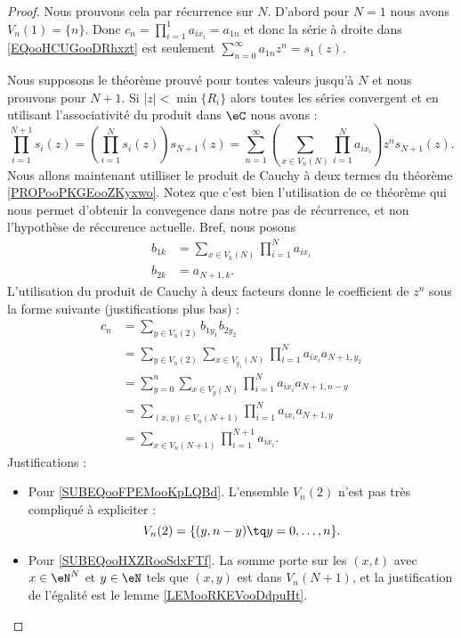 \begin{proof}
	Nous prouvons cela par récurrence sur \( N\). D'abord pour \( N=1\) nous avons \( V_n(1)=\{ n \}\). Donc \( c_n=\prod_{i=1}^1a_{ix_i}=a_{1n}\) et donc la série à droite dans \eqref{EQooHCUGooDRhxzt} est seulement \( \sum_{n=0}^{\infty}a_{1n}z^n=s_1(z)\).

	Nous supposons le théorème prouvé pour toutes valeurs jusqu'à \( N\) et nous prouvons pour \( N+1\). Si \( | z |<\min\{ R_i \}\) alors toutes les séries convergent et en utilisant l'associativité du produit dans \( \eC\) nous avons :
	\begin{equation}
		\prod_{i=1}^{N+1}s_i(z)=\left( \prod_{i=1}^Ns_i(z) \right)s_{N+1}(z)=\sum_{n=1}^{\infty}\left( \sum_{x\in V_n(N)}\prod_{i=1}^Na_{ix_i} \right)z^ns_{N+1}(z).
	\end{equation}
	Nous allons maintenant utilliser le produit de Cauchy à deux termes du théorème \ref{PROPooPKGEooZKyxwo}. Notez que c'est bien l'utilisation de ce théorème qui nous permet d'obtenir la convegence dans notre pas de récurrence, et non l'hypothèse de réccurence actuelle. Bref, nous posons
	\begin{subequations}
		\begin{align}
			b_{1k} & =\sum_{x\in V_k(N)}\prod_{i=1}^Na_{ix_i} \\
			b_{2k} & =a_{N+1,k}.
		\end{align}
	\end{subequations}
	L'utilisation du produit de Cauchy à deux facteurs donne le coefficient de \( z^n\) sous la forme suivante (justifications plus bas)  :
	\begin{subequations}
		\begin{align}
			c_n & =\sum_{y\in V_n(2)}b_{1y_1}b_{2y_2}                                                                \\
			    & =\sum_{y\in V_n(2)}\sum_{x\in V_{y_1}(N)}\prod_{i=1}^Na_{ix_i}a_{N+1,y_2}                          \\
			    & =\sum_{y=0}^n\sum_{x\in V_y(N)}\prod_{i=1}^Na_{ix_i}a_{N+1,n-y}        \label{SUBEQooFPEMooKpLQBd} \\
			    & =\sum_{(x,y)\in V_n(N+1)}\prod_{i=1}^Na_{ix_i}a_{N+1, y}       \label{SUBEQooHXZRooSdxFTf}         \\
			    & =\sum_{x\in V_n(N+1)}\prod_{i=1}^{N+1}a_{ix_i}.
		\end{align}
	\end{subequations}
	Justifications :
	\begin{itemize}
		\item Pour \eqref{SUBEQooFPEMooKpLQBd}. L'ensemble \( V_n(2)\) n'est pas très compliqué à expliciter :
		      \begin{equation}
			      V_n(2)=\{ (y,n-y)\tq y=0,\ldots, n \}.
		      \end{equation}
		\item   Pour \eqref{SUBEQooHXZRooSdxFTf}. La somme porte sur les \( (x,t)\) avec \(x\in \eN^N\) et \( y\in \eN\) tels que \( (x,y) \) est dans \( V_n(N+1)\), et la justification de l'égalité est le lemme \ref{LEMooRKEVooDdpuHt}.
	\end{itemize}
\end{proof}




